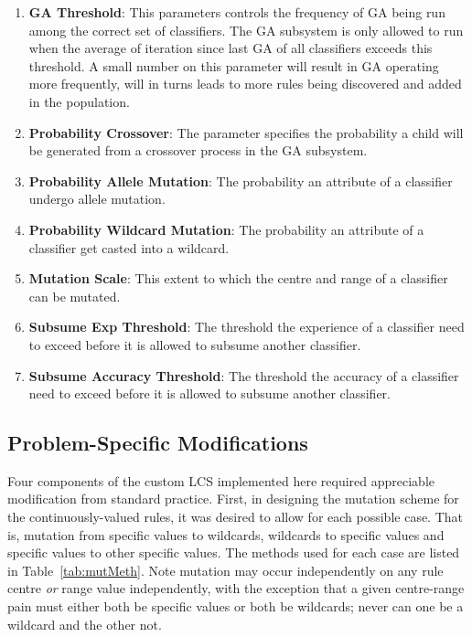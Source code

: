 \documentclass[11pt]{article}
\begin{document}
\begin{enumerate}
	\item \textbf{GA Threshold}: This parameters controls the frequency of GA being run among the correct set of classifiers. The GA subsystem is only allowed to run when the average of iteration since last GA of all classifiers exceeds this threshold. A small number on this parameter will result in GA operating more frequently, will in turns leads to more rules being discovered and added in the population.  
	\item \textbf{Probability Crossover}: The parameter specifies the probability a child will be generated from a crossover process in the GA subsystem. 
	\item \textbf{Probability Allele Mutation}: The probability an attribute of a classifier undergo allele mutation.
	\item \textbf{Probability Wildcard Mutation}: The probability an attribute of a classifier get casted into a wildcard.
	\item \textbf{Mutation Scale}: This extent to which the centre and range of a classifier can be mutated.
	\item \textbf{Subsume Exp Threshold}: The threshold the experience of a classifier need to exceed before it is allowed to subsume another classifier.
	\item \textbf{Subsume Accuracy Threshold}: The threshold the accuracy of a classifier need to exceed before it is allowed to subsume another classifier.
\end{enumerate}










\subsection{Problem-Specific Modifications}
\label{sec:exp2mods}

Four components of the custom LCS implemented here required appreciable modification from standard practice. First, in designing the mutation scheme for the continuously-valued rules, it was desired to allow for each possible case. That is, mutation from specific values to wildcards, wildcards to specific values and specific values to other specific values. The methods used for each case are listed in Table~\ref{tab:mutMeth}. Note mutation may occur independently on any rule centre \textit{or} range value independently, with the exception that a given centre-range pain must either both be specific values or both be wildcards; never can one be a wildcard and the other not.
\end{document}
